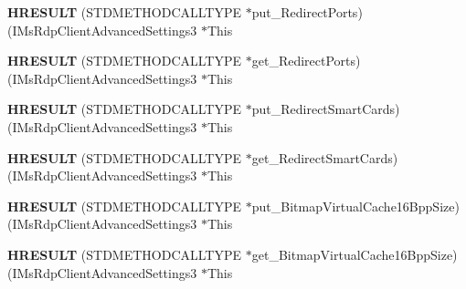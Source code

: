 \begin{DoxyCompactItemize}
\item 
\mbox{\label{struct_i_ms_rdp_client_advanced_settings3_vtbl_ae2209091f092ab5436d88c6ebc6b3606}} 
{\bfseries H\+R\+E\+S\+U\+LT} (S\+T\+D\+M\+E\+T\+H\+O\+D\+C\+A\+L\+L\+T\+Y\+PE $\ast$put\+\_\+\+Redirect\+Ports)(I\+Ms\+Rdp\+Client\+Advanced\+Settings3 $\ast$This
\item 
\mbox{\label{struct_i_ms_rdp_client_advanced_settings3_vtbl_a8c9062b36c7fe6431d8ca312a5708f6a}} 
{\bfseries H\+R\+E\+S\+U\+LT} (S\+T\+D\+M\+E\+T\+H\+O\+D\+C\+A\+L\+L\+T\+Y\+PE $\ast$get\+\_\+\+Redirect\+Ports)(I\+Ms\+Rdp\+Client\+Advanced\+Settings3 $\ast$This
\item 
\mbox{\label{struct_i_ms_rdp_client_advanced_settings3_vtbl_a16eb48f07ba0c979e4285a2417e98c5c}} 
{\bfseries H\+R\+E\+S\+U\+LT} (S\+T\+D\+M\+E\+T\+H\+O\+D\+C\+A\+L\+L\+T\+Y\+PE $\ast$put\+\_\+\+Redirect\+Smart\+Cards)(I\+Ms\+Rdp\+Client\+Advanced\+Settings3 $\ast$This
\item 
\mbox{\label{struct_i_ms_rdp_client_advanced_settings3_vtbl_abe252ad33066bae9f9e7c035062a25ef}} 
{\bfseries H\+R\+E\+S\+U\+LT} (S\+T\+D\+M\+E\+T\+H\+O\+D\+C\+A\+L\+L\+T\+Y\+PE $\ast$get\+\_\+\+Redirect\+Smart\+Cards)(I\+Ms\+Rdp\+Client\+Advanced\+Settings3 $\ast$This
\item 
\mbox{\label{struct_i_ms_rdp_client_advanced_settings3_vtbl_abf04e3175af2f339da0c0bceabc2617d}} 
{\bfseries H\+R\+E\+S\+U\+LT} (S\+T\+D\+M\+E\+T\+H\+O\+D\+C\+A\+L\+L\+T\+Y\+PE $\ast$put\+\_\+\+Bitmap\+Virtual\+Cache16\+Bpp\+Size)(I\+Ms\+Rdp\+Client\+Advanced\+Settings3 $\ast$This
\item 
\mbox{\label{struct_i_ms_rdp_client_advanced_settings3_vtbl_ab5bea436cc8dfb45525b04ea17c6b710}} 
{\bfseries H\+R\+E\+S\+U\+LT} (S\+T\+D\+M\+E\+T\+H\+O\+D\+C\+A\+L\+L\+T\+Y\+PE $\ast$get\+\_\+\+Bitmap\+Virtual\+Cache16\+Bpp\+Size)(I\+Ms\+Rdp\+Client\+Advanced\+Settings3 $\ast$This
\item 
\mbox{\label{struct_i_ms_rdp_client_advanced_settings3_vtbl_a6106e758b0d4bb905b5a0c7752237536}} 

\end{DoxyCompactItemize}
